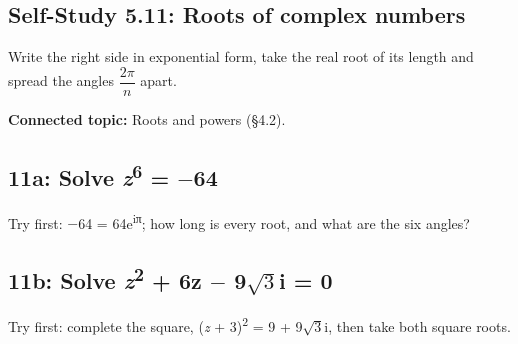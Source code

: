 \documentclass[11pt]{article}
\begin{document}
\begin{keepsection}
\section{Self-Study 5.11: Roots of complex numbers}

Write the right side in exponential form, take the real root of its length and spread the angles {\small\ensuremath{\dfrac{2π}{{n}}}} apart.

\textbf{Connected topic:} Roots and powers (§4.2).

\begin{keepsection}
\subsection{11a: Solve \textit{z}\textsuperscript{6} = \ensuremath{-}64}

Try first: \ensuremath{-}64 = 64e\textsuperscript{iπ}; how long is every root, and what are the six angles?

\end{keepsection}

\begin{keepsection}
\subsection{11b: Solve \textit{z}\textsuperscript{2} + 6z \ensuremath{-} 9\ensuremath{\sqrt{3}}i = 0}

Try first: complete the square, (\textit{z} + 3)\textsuperscript{2} = 9 + 9\ensuremath{\sqrt{3}}i, then take both square roots.

\end{keepsection}
\end{keepsection}
\end{document}
